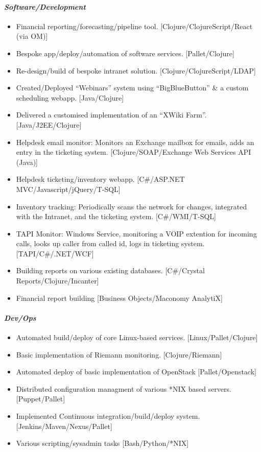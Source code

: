 \documentclass{article}
\begin{document}
\paragraph*{\emph{Software/Development}}
\begin{itemize}
\item Financial reporting/forecasting/pipeline tool.
             [Clojure/ClojureScript/React (via OM)]
\item Bespoke app/deploy/automation of software services.
             [Pallet/Clojure]
\item Re-design/build of bespoke intranet solution.
             [Clojure/ClojureScript/LDAP]
\item Created/Deployed ``Webinars'' system using ``BigBlueButton'' \& a
             custom scheduling webapp. [Java/Clojure]
\item Delivered a customised implementation of an ``XWiki Farm''.
            [Java/J2EE/Clojure]
\item Helpdesk email monitor: Monitors an Exchange mailbox for emails,
            adds an entry in the ticketing system.
            [Clojure/SOAP/Exchange Web Services API (Java)]
\item Helpdesk ticketing/inventory webapp.
            [C\#/ASP.NET MVC/Javascript/jQuery/T-SQL]
\item Inventory tracking: Periodically scans the network for changes,
            integrated with the Intranet, and the ticketing system.
            [C\#/WMI/T-SQL]
\item TAPI Monitor: Windows Service, monitoring a VOIP extention for
            incoming calls, looks up caller from called id, logs in ticketing
            system. [TAPI/C\#/.NET/WCF]
\item Building reports on various existing databases.
            [C\#/Crystal Reports/Clojure/Incanter]
\item Financial report building [Business Objects/Maconomy AnalytiX]
\end{itemize}
\paragraph*{\emph{Dev/Ops}}
\begin{itemize}
\item Automated build/deploy of core Linux-based services.
             [Linux/Pallet/Clojure]
\item Basic implementation of Riemann monitoring. [Clojure/Riemann]
\item Automated deploy of basic implementation of OpenStack
             [Pallet/Openstack]
\item Distributed configuration managment of various *NIX based servers.
             [Puppet/Pallet]
\item Implemented Continuous integration/build/deploy system.
             [Jenkins/Maven/Nexus/Pallet]
\item Various scripting/sysadmin tasks [Bash/Python/*NIX]
\end{itemize}
\end{document}

